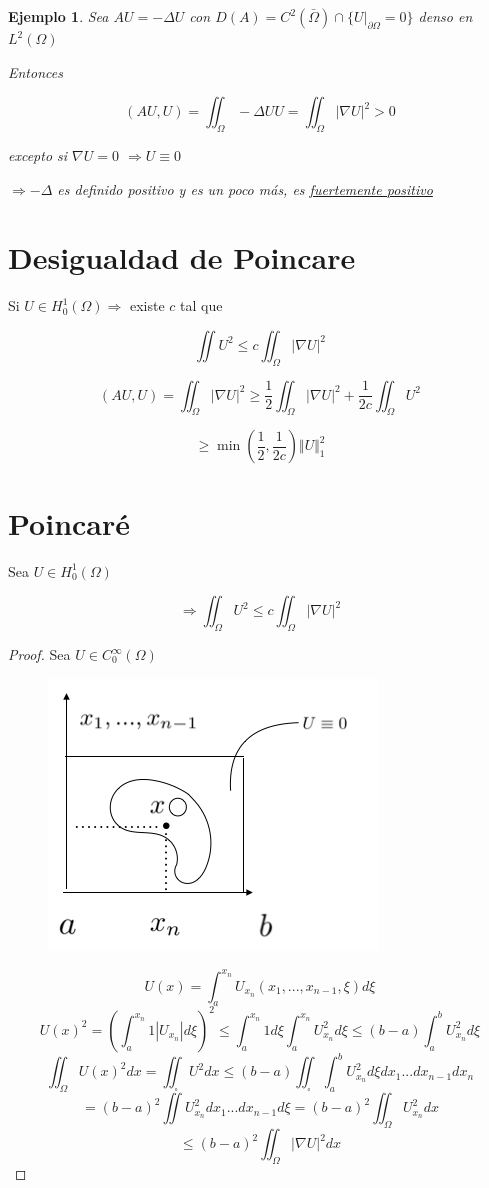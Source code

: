 \documentclass[a4paper,10pt]{book}
\newtheorem{ejemplo}{Ejemplo}
\begin{document}
\begin{ejemplo}
    Sea $AU=-\Delta U$ con $D(A) = C^2 (\bar{\Omega}) \cap \{ U|_{\partial \Omega} =0\}$ denso en $L^2(\Omega)$

    Entonces 

    \[
    (AU,U)= \iint_\Omega -\Delta U U = \iint_\Omega |\nabla U| ^2 > 0 
    \]
    
 excepto si $ \nabla U= 0$ $\Rightarrow  U\equiv 0 $

 $\Rightarrow -\Delta $ es definido positivo y es un poco más, es \underline{fuertemente positivo}
 
 \end{ejemplo}
\section{Desigualdad de Poincare}

Si $U \in H_0^1(\Omega) \Rightarrow $ existe $c$ tal que 

\[
\iint U^2 \leq c \iint_\Omega |\nabla U |^2 
\]

 \[
 (AU,U)= \iint _\Omega |\nabla U|^2 \geq \frac{1}{2} \iint_\Omega |\nabla U|^2 +\frac{1}{2c} \iint_\Omega U^2
 \]

 \[
 \geq \min \left( \frac{1}{2},\frac{1}{2c} \right) \Vert U \Vert_1^2
 \]

\section{Poincaré}

Sea $U\in H_0^1(\Omega)$

\[
\Rightarrow   \iint_\Omega U^2 \leq c \iint_\Omega |\nabla U | ^2 \]

\begin{proof}
     Sea $U\in C_0^\infty(\Omega) $ 
     \begin{figure}[H]
         \centering
         \includegraphics[width=0.5\linewidth]{Screen Shot 2024-03-06 at 21.12.47.png}
         \caption{}
         \label{fig:enter-label}
     \end{figure}
     \[U(x)= \int_a^{x_n} U_{x_n} ( x_1,...,x_{n-1} ,\xi )d\xi\]
     \[
     U(x)^2= \left(  \int_a^{x_n} 1 |U_{x_n}| d\xi \right)^2\leq \int_a^{x_n} 1 d\xi \int_a^{x_n} U_{x_n}^2 d\xi\leq (b-a) \int_a^b U_{x_n}^2 d\xi 
     \]
     \[
     \iint_\Omega U(x)^2 dx= \iint_{\square} U^2 dx \leq (b-a) \iint_{\square} \int_a^b  U_{x_n}^2 d\xi d x_1...d x_{n-1} dx_n
     \]
     \[
     =(b-a)^2 \iint U_{x_n}^2 dx_1 ... dx_{n-1} d\xi = (b-a)^2 \iint_\Omega U_{x_n}^2 dx 
     \]
     \[
     \leq (b-a)^2 \iint_\Omega |\nabla U|^2 dx
     \]
     
\end{proof}
\end{document}
